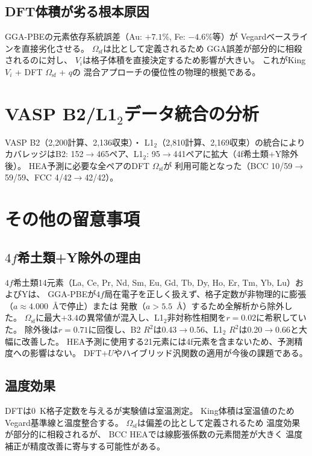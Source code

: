 \documentclass[5p,10pt]{elsarticle}
\begin{document}
\subsection{DFT体積が劣る根本原因}
\label{sec:appendix_dft_limitation}

GGA-PBEの元素依存系統誤差（Au: $+7.1$\%, Fe: $-4.6$\%等）が
Vegardベースラインを直接劣化させる。
$\Omega_\text{sf}$は比として定義されるため
GGA誤差が部分的に相殺されるのに対し、
$V_i$は格子体積を直接決定するため影響が大きい。
これがKing $V_i$ + DFT $\Omega_\text{sf}$ + $q$の
混合アプローチの優位性の物理的根拠である。


\section{VASP B2/L1$_2$データ統合の分析}
\label{sec:appendix_vasp}

VASP B2（2,200計算、2,136収束）・
L1$_2$（2,810計算、2,169収束）の統合により
カバレッジはB2: 152$\to$465ペア、L1$_2$: 95$\to$441ペアに拡大（4f希土類+Y除外後）。
HEA予測に必要な全ペアのDFT $\Omega_\text{sf}$が
利用可能となった（BCC 10/59$\to$59/59、FCC 4/42$\to$42/42）。


\section{その他の留意事項}
\label{sec:appendix_notes}

\subsection{$4f$希土類+Y除外の理由}
\label{sec:appendix_gdce}

$4f$希土類14元素（La, Ce, Pr, Nd, Sm, Eu, Gd, Tb, Dy, Ho, Er, Tm, Yb, Lu）およびYは、
GGA-PBEが$4f$局在電子を正しく扱えず、格子定数が非物理的に膨張（$a \approx 4.000$~\AA{}で停止）または
発散（$a > 5.5$~\AA）するため全解析から除外した。
$\Omega_\text{sf}$に最大$+3.4$の異常値が混入し、L1$_2$非対称性相関を$r = 0.02$に希釈していた。
除外後は$r = 0.71$に回復し、B2 $R^2$は0.43$\to$0.56、L1$_2$ $R^2$は0.20$\to$0.66と大幅に改善した。
HEA予測に使用する21元素には4f元素を含まないため、予測精度への影響はない。
DFT+$U$やハイブリッド汎関数の適用が今後の課題である。

\subsection{温度効果}

DFTは0~K格子定数を与えるが実験値は室温測定。
King体積は室温値のためVegard基準線と温度整合する。
$\Omega_\text{sf}$は偏差の比として定義されるため
温度効果が部分的に相殺されるが、
BCC HEAでは線膨張係数の元素間差が大きく
温度補正が精度改善に寄与する可能性がある。
\end{document}
